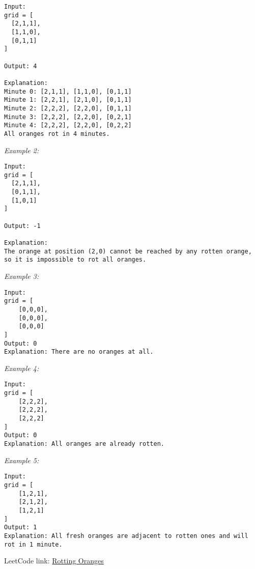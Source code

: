 \begin{verbatim}
Input:
grid = [
  [2,1,1],
  [1,1,0],
  [0,1,1]
]

Output: 4

Explanation:
Minute 0: [2,1,1], [1,1,0], [0,1,1]
Minute 1: [2,2,1], [2,1,0], [0,1,1]
Minute 2: [2,2,2], [2,2,0], [0,1,1]
Minute 3: [2,2,2], [2,2,0], [0,2,1]
Minute 4: [2,2,2], [2,2,0], [0,2,2]
All oranges rot in 4 minutes.
\end{verbatim}

\textit{Example 2:}

\begin{verbatim}
Input:
grid = [
  [2,1,1],
  [0,1,1],
  [1,0,1]
]

Output: -1

Explanation:
The orange at position (2,0) cannot be reached by any rotten orange, so it is impossible to rot all oranges.
\end{verbatim}

\textit{Example 3:}
\begin{verbatim}
Input:
grid = [
    [0,0,0],
    [0,0,0],
    [0,0,0]
]
Output: 0
Explanation: There are no oranges at all.
\end{verbatim}

\textit{Example 4:}
\begin{verbatim}
Input:
grid = [
    [2,2,2],
    [2,2,2],
    [2,2,2]
]
Output: 0
Explanation: All oranges are already rotten.
\end{verbatim}

\textit{Example 5:}
\begin{verbatim}
Input:
grid = [
    [1,2,1],
    [2,1,2],
    [1,2,1]
]
Output: 1
Explanation: All fresh oranges are adjacent to rotten ones and will rot in 1 minute.
\end{verbatim}

LeetCode link: \href{https://leetcode.com/problems/rotting-oranges/}{Rotting Oranges}


